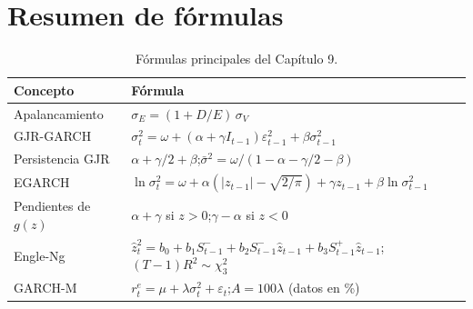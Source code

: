 \section{Resumen de fórmulas}

\begin{table}[H]
\centering\small
\begin{tabular}{@{}ll@{}}
\toprule
Concepto & Fórmula \\
\midrule
Apalancamiento & $\sigma_E=(1+D/E)\,\sigma_V$ \\
GJR-GARCH & $\sigma_t^2=\omega+(\alpha+\gamma I_{t-1})\varepsilon_{t-1}^2+\beta\sigma_{t-1}^2$ \\
Persistencia GJR & $\alpha+\gamma/2+\beta$;\quad $\bar\sigma^2=\omega/(1-\alpha-\gamma/2-\beta)$ \\
EGARCH & $\ln\sigma_t^2=\omega+\alpha(|z_{t-1}|-\sqrt{2/\pi})+\gamma z_{t-1}+\beta\ln\sigma_{t-1}^2$ \\
Pendientes de $g(z)$ & $\alpha+\gamma$ si $z>0$;\quad $\gamma-\alpha$ si $z<0$ \\
Engle-Ng & $\hat z_t^2=b_0+b_1S^-_{t-1}+b_2S^-_{t-1}\hat z_{t-1}+b_3S^+_{t-1}\hat z_{t-1}$;\quad $(T-1)R^2\sim\chi^2_3$ \\
GARCH-M & $r^e_t=\mu+\lambda\sigma_t^2+\varepsilon_t$;\quad $A=100\lambda$ (datos en \%) \\
\bottomrule
\end{tabular}
\caption{Fórmulas principales del Capítulo 9.}
\end{table}

